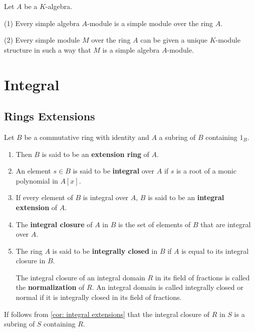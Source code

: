 \begin{theorem}
    Let $A$ be a $K$-algebra.

    (1)
    Every simple algebra $A$-module is a simple module over the ring $A$.

    (2)
    Every simple module $M$ over the ring $A$ can be given a unique $K$-module structure in such a way that $M$ is a simple algebra $A$-module.
\end{theorem}













\chapter{Integral}
\section{Rings Extensions} %
\begin{definition}
    Let $B$ be a commutative ring with identity and $A$ a subring of $B$ containing $1_B$.

    \begin{enumerate}
        \item
              Then $B$ is said to be an \textbf{extension ring} of $A$.
        \item
              An element $s\in B$ is said to be \textbf{integral} over $A$ if
              $s$ is a root of  a monic polynomial in $A[x]$.
        \item
              If every element of $B$ is integral over $A$, $B$ is said to be an \textbf{integral extension} of $A$.
        \item
              The \textbf{integral closure} of $A$ in $B$ is the set of elements of $B$ that are integral over $A$.
        \item
              The ring $A$ is said to be \textbf{integrally closed} in $B$ if $A$ is equal to its integral closure in $B$.

              The integral closure of an integral domain $R$ in its field of fractions is called the \textbf{normalization} of $R$. An integral domain is called integrally closed or normal if it is integrally closed in its field of fractions.
    \end{enumerate}
    \begin{remark}
        If follows from \cref{cor: integral extensions} that the integral closure of $R$ in $S$ is a subring of $S$ containing $R$.
    \end{remark}
\end{definition}



